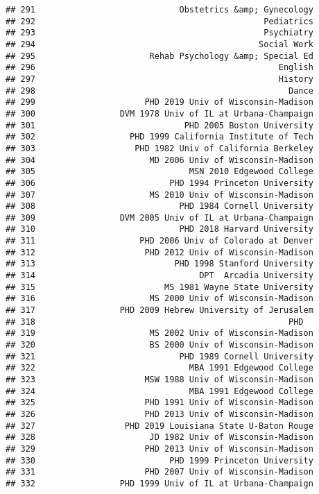 \documentclass[
]{article}
\begin{document}
\begin{verbatim}
## 291                             Obstetrics &amp; Gynecology
## 292                                              Pediatrics
## 293                                              Psychiatry
## 294                                             Social Work
## 295                       Rehab Psychology &amp; Special Ed
## 296                                                 English
## 297                                                 History
## 298                                                   Dance
## 299                      PHD 2019 Univ of Wisconsin-Madison
## 300                 DVM 1978 Univ of IL at Urbana-Champaign
## 301                              PHD 2005 Boston University
## 302                   PHD 1999 California Institute of Tech
## 303                    PHD 1982 Univ of California Berkeley
## 304                       MD 2006 Univ of Wisconsin-Madison
## 305                               MSN 2010 Edgewood College
## 306                           PHD 1994 Princeton University
## 307                       MS 2010 Univ of Wisconsin-Madison
## 308                             PHD 1984 Cornell University
## 309                 DVM 2005 Univ of IL at Urbana-Champaign
## 310                             PHD 2018 Harvard University
## 311                     PHD 2006 Univ of Colorado at Denver
## 312                      PHD 2012 Univ of Wisconsin-Madison
## 313                            PHD 1998 Stanford University
## 314                                 DPT  Arcadia University
## 315                          MS 1981 Wayne State University
## 316                       MS 2000 Univ of Wisconsin-Madison
## 317                 PHD 2009 Hebrew University of Jerusalem
## 318                                                   PHD  
## 319                       MS 2002 Univ of Wisconsin-Madison
## 320                       BS 2000 Univ of Wisconsin-Madison
## 321                             PHD 1989 Cornell University
## 322                               MBA 1991 Edgewood College
## 323                      MSW 1988 Univ of Wisconsin-Madison
## 324                               MBA 1991 Edgewood College
## 325                      PHD 1991 Univ of Wisconsin-Madison
## 326                      PHD 2013 Univ of Wisconsin-Madison
## 327                  PHD 2019 Louisiana State U-Baton Rouge
## 328                       JD 1982 Univ of Wisconsin-Madison
## 329                      PHD 2013 Univ of Wisconsin-Madison
## 330                           PHD 1999 Princeton University
## 331                      PHD 2007 Univ of Wisconsin-Madison
## 332                 PHD 1999 Univ of IL at Urbana-Champaign

\end{verbatim}
\end{document}
